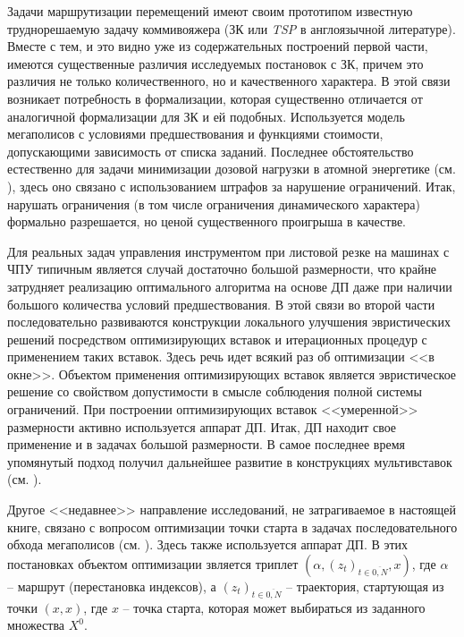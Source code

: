 \documentclass[11pt,twoside,openany]{report}
\begin{document}
{{Задачи маршрутизации перемещений имеют своим прототипом известную труднорешаемую задачу коммивояжера
(ЗК или {\it TSP} в англоязычной литературе).
Вместе с тем, и это видно уже из содержательных построений первой части,
имеются существенные различия исследуемых постановок с ЗК,
причем это различия не только количественного, но и качественного характера.
В этой связи возникает потребность в формализации,
которая существенно отличается от аналогичной формализации для ЗК и ей подобных.
Используется модель мегаполисов с условиями предшествования и функциями стоимости,
допускающими зависимость от списка заданий.
Последнее обстоятельство естественно для задачи минимизации дозовой нагрузки в атомной энергетике
(см. \cite{Cha2`}),
здесь оно связано с использованием штрафов за нарушение ограничений.
Итак, нарушать ограничения
(в том числе ограничения динамического характера)
формально разрешается, но ценой существенного проигрыша в качестве.

Для реальных задач управления инструментом при листовой резке на машинах с ЧПУ
типичным является случай достаточно большой размерности,
что крайне затрудняет реализацию оптимального алгоритма на основе ДП
даже при наличии большого количества условий предшествования.
В этой связи во второй части последовательно развиваются
конструкции локального улучшения эвристических решений
посредством оптимизирующих вставок и итерационных процедур с применением таких вставок.
Здесь речь идет всякий раз об оптимизации <<в окне>>.
Объектом применения оптимизирующих вставок является
эвристическое решение со свойством допустимости
в смысле соблюдения полной системы ограничений.
При построении оптимизирующих вставок <<умеренной>> размерности
активно используется аппарат ДП.
Итак, ДП находит свое применение и в задачах большой размерности.
В самое последнее время упомянутый подход получил дальнейшее развитие
в конструкциях мультивставок
(см. \cite{ChenGrig, ChenChenGrig}).

Другое <<недавнее>> направление исследований,
не затрагиваемое в настоящей книге,
связано с вопросом оптимизации точки старта в задачах последовательного обхода мегаполисов
(см. \cite{StartPoint,StartFinishPoint,ChenChen}).
Здесь также используется аппарат ДП.
В этих постановках объектом оптимизации звляется триплет
$(\alpha,(z_t)_{t\in \overline{0,N}},x)$,
где $\alpha$ -- маршрут (перестановка индексов),
а $(z_t)_{t\in \overline{0,N}}$ -- траектория, стартующая из точки $(x,x)$,
где $x$ -- точка старта, которая может выбираться из заданного множества $X^0$.

}}
\end{document}
